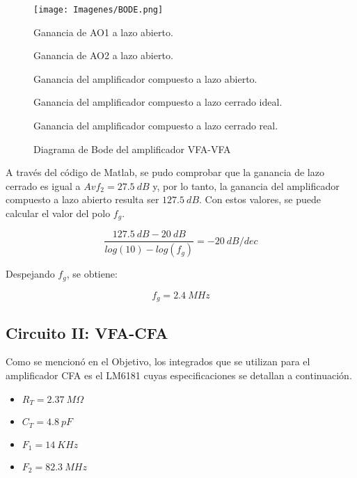 \documentclass[12pt,A4paper,titlepage]{article}
\begin{document}
\begin{figure}[!h]
    \centering
    \texttt{[image: Imagenes/BODE.png]}
    \caption{Diagrama de Bode del amplificador VFA-VFA}
    \label{fig:foto}
        \begin{description} [itemsep=1pt, parsep=0pt, partopsep=0pt, topsep=0pt]
         \centering
         \small
         \item[Azul:]  Ganancia de AO1 a lazo abierto.
         \item[Amarillo:]  Ganancia de AO2 a lazo abierto.
         \item[Naranja:]  Ganancia del amplificador compuesto a lazo abierto.
         \item[Violeta:]  Ganancia del amplificador compuesto a lazo cerrado ideal.
         \item[Verde:]  Ganancia del amplificador compuesto a lazo cerrado real.
        \end{description}
\end{figure}

\newpage
\hspace{1mm} A través del código de Matlab, se pudo comprobar que la ganancia de lazo cerrado es igual a \(Avf_2=27.5~dB\) y, por lo tanto, la ganancia del amplificador compuesto a lazo abierto resulta ser \(127.5~dB\). Con estos valores, se puede calcular el valor del polo \(f_g\).

\begin{equation}
    \frac{127.5~dB-20~dB}{log(10)-log(f_g)}=-20~dB/dec
\end{equation}

\bigskip
\hspace{1mm} Despejando \(f_g\), se obtiene:

\begin{equation}
    f_g=2.4~MHz
\end{equation}

\newpage
\subsection{Circuito II: VFA-CFA}
\hspace{1mm} Como se mencionó en el Objetivo, los integrados que se utilizan para el amplificador CFA es el LM6181 cuyas especificaciones se detallan a continuación.

\begin{itemize}[itemsep=1pt]
    \item \(R_T=2.37~M\Omega\)
    \item \(C_T=4.8~pF\)
    \item \(F_1=14~KHz\)
    \item \(F_2=82.3~MHz\)
\end{itemize}
\end{document}
